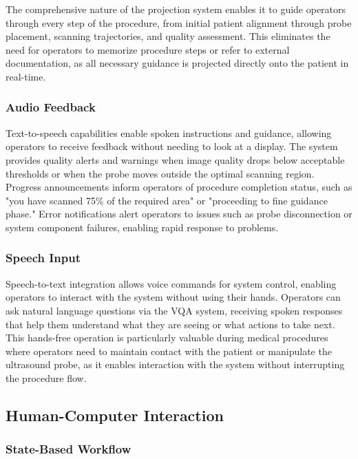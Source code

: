 \documentclass[12pt,a4paper]{article}
\begin{document}
The comprehensive nature of the projection system enables it to guide operators through every step of the procedure, from initial patient alignment through probe placement, scanning trajectories, and quality assessment. This eliminates the need for operators to memorize procedure steps or refer to external documentation, as all necessary guidance is projected directly onto the patient in real-time.

\subsubsection{Audio Feedback}

Text-to-speech capabilities enable spoken instructions and guidance, allowing operators to receive feedback without needing to look at a display. The system provides quality alerts and warnings when image quality drops below acceptable thresholds or when the probe moves outside the optimal scanning region. Progress announcements inform operators of procedure completion status, such as "you have scanned 75\% of the required area" or "proceeding to fine guidance phase." Error notifications alert operators to issues such as probe disconnection or system component failures, enabling rapid response to problems.

\subsubsection{Speech Input}

Speech-to-text integration allows voice commands for system control, enabling operators to interact with the system without using their hands. Operators can ask natural language questions via the VQA system, receiving spoken responses that help them understand what they are seeing or what actions to take next. This hands-free operation is particularly valuable during medical procedures where operators need to maintain contact with the patient or manipulate the ultrasound probe, as it enables interaction with the system without interrupting the procedure flow.

\subsection{Human-Computer Interaction}

\subsubsection{State-Based Workflow}
\end{document}
